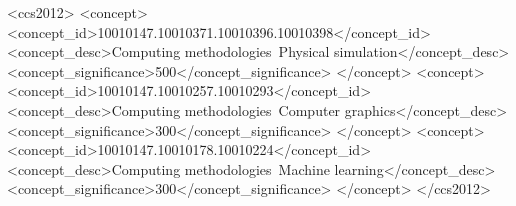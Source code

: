 \documentclass[acmtog,anonymous,review]{acmart}
\begin{document}
%
%

\begin{CCSXML}
<ccs2012>
 <concept>
  <concept_id>10010147.10010371.10010396.10010398</concept_id>
  <concept_desc>Computing methodologies~Physical simulation</concept_desc>
  <concept_significance>500</concept_significance>
 </concept>
 <concept>
  <concept_id>10010147.10010257.10010293</concept_id>
  <concept_desc>Computing methodologies~Computer graphics</concept_desc>
  <concept_significance>300</concept_significance>
 </concept>
 <concept>
  <concept_id>10010147.10010178.10010224</concept_id>
  <concept_desc>Computing methodologies~Machine learning</concept_desc>
  <concept_significance>300</concept_significance>
 </concept>
</ccs2012>
\end{CCSXML}




%
%





\maketitle


\end{document}
